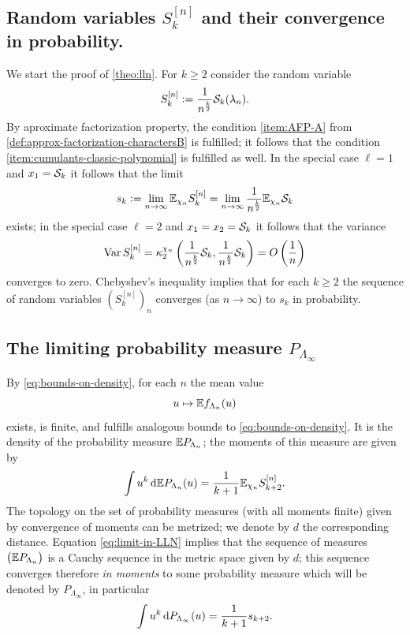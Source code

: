 \documentclass[12pt,usenames,dvipsnames,svgnames,table]{amsart}
\begin{document}
\subsection{Random variables $S^{[n]}_k$ and their convergence in probability.}
We start the proof of \cref{theo:lln}.
For $k\geq 2$ consider the random variable 
\[ S_k^{[n]}:=\frac{1}{n^{\frac{k}{2}}} \mathcal{S}_k(\lambda_n).\]
By aproximate factorization property,
the condition \ref{item:AFP-A} from \cref{def:approx-factorization-charactersB}
is fulfilled; it follows that the condition \ref{item:cumulants-classic-polynomial}
is fulfilled as well. In the special case $\ell=1$ and $x_1=\mathcal{S}_k$ it follows that the limit
\begin{equation}
\label{eq:limit-in-LLN}
s_k:=\lim_{n\to\infty} \mathbb{E}_{\chi_n} S^{[n]}_k  = 
\lim_{n\to\infty} \frac{1}{n^{\frac{k}{2}}} \mathbb{E}_{\chi_n}  \mathcal{S}_k   
\end{equation}
exists; in the special case $\ell=2$ and $x_1=x_2=\mathcal{S}_k$ it follows that the variance
\[ \operatorname{Var} S^{[n]}_k = 
\kappa_2^{\chi_n}\left( \frac{1}{n^{\frac{k}{2}}} \mathcal{S}_k,\frac{1}{n^{\frac{k}{2}}} \mathcal{S}_k  \right)=
O\left( \frac{1}{n} \right) \]
converges to zero. 
Chebyshev's inequality implies that for each $k\geq 2$ the sequence of random variables $(S_k^{[n]})_n$ converges 
(as $n\to\infty$) to $s_k$ in probability. 

\subsection{The limiting probability measure $P_{\Lambda_\infty}$}
\label{sec:limit-measure-Plambdainfty}
By \eqref{eq:bounds-on-density}, for each $n$ the mean value  
\begin{equation}
\label{eq:mean-value}
u \mapsto \mathbb{E} f_{\Lambda_n}(u)   
\end{equation}
exists, is finite, and fulfills analogous bounds to \eqref{eq:bounds-on-density}.
It is the density of the probability measure $\mathbb{E} P_{\Lambda_n}$;
the moments of this measure are given by
\[ \int u^k \dif \E P_{\Lambda_n}(u)= \frac{1}{k+1} \E_{\chi_n} S^{[n]}_{k+2}  .\]
The topology on the set of probability measures (with all moments finite) 
given by convergence of moments can be metrized; we denote by $d$ the corresponding distance.
Equation \eqref{eq:limit-in-LLN} implies that the sequence of measures
$\left( \mathbb{E} P_{\Lambda_n} \right)$ is a Cauchy sequence in the metric space given by $d$; 
this sequence 
converges therefore \emph{in moments} to some probability
measure which will be denoted by $P_{\Lambda_\infty}$,
in particular
\[ \int u^k \dif P_{\Lambda_\infty}(u)=  \frac{1}{k+1} s_{k+2}.\]
\end{document}
